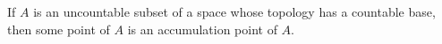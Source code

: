 If $A$ is an uncountable subset of a space whose topology has a countable base, then some point of $A$ is an accumulation point of $A$.

